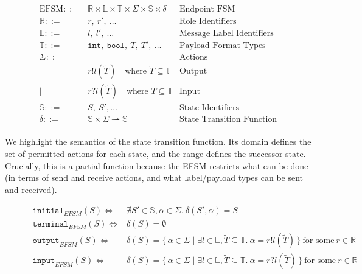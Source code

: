 \begin{figure}[!hb]
\doublespacing
\[
\begin{array}{rlr}

\text{EFSM} ::= & \mathbb{R} \times \mathbb{L} \times \mathbb{T} \times \Sigma \times \mathbb{S} \times \delta & \text{Endpoint FSM} \\

\mathbb{R} ::= & r,~r',~\dots & \text{Role Identifiers} \\

\mathbb{L} ::= & l,~l',~\dots & \text{Message Label Identifiers} \\

\mathbb{T} ::= & \texttt{int},~\texttt{bool},~T,~T',~\dots & \text{Payload Format Types} \\

\Sigma ::= & & \text{Actions} \\
     & r!l(\tilde{T}) \quad \text{where } \tilde{T} \subseteq \mathbb{T} & \text{Output} \\
\mid & r?l(\tilde{T}) \quad \text{where } \tilde{T} \subseteq \mathbb{T} & \text{Input} \\

\mathbb{S} ::= & S,~S',\dots & \text{State Identifiers} \\

\delta ::= & \mathbb{S} \times \Sigma \rightharpoonup \mathbb{S} & \text{State Transition Function} \\

\end{array}
\]
\singlespacing
{}
\label{fig:efsmsyntax}
\end{figure}

We highlight the semantics of the {state transition function}. Its domain defines the set of permitted actions for each state, and the range defines the successor state. Crucially, this is a {partial function} because the EFSM restricts what can be done (in terms of send and receive actions, and what label/payload types can be sent and received). 

\begin{figure}[!h]
\doublespacing
\[
\begin{array}{rl}

\texttt{initial}_{EFSM}(S) \iff & \nexists S' \in \mathbb{S},\alpha \in \Sigma.~\delta(S',\alpha) = S \\
\texttt{terminal}_{EFSM}(S) \iff & \delta(S) = \emptyset \\
\texttt{output}_{EFSM}(S) \iff & \delta(S) = \{\,\alpha \in \Sigma \mid \exists l \in \mathbb{L}, \tilde{T} \subseteq{\mathbb{T}}.~\alpha = r!l(\tilde{T})\,\}~\text{for some}~r \in \mathbb{R} \\
\texttt{input}_{EFSM}(S) \iff & \delta(S) = \{\,\alpha \in \Sigma \mid \exists l \in \mathbb{L}, \tilde{T} \subseteq{\mathbb{T}}.~\alpha = r?l(\tilde{T})\,\}~\text{for some}~r \in \mathbb{R}
\end{array}
\]
\singlespacing
{}
\label{fig:efsmstates}
\end{figure}

